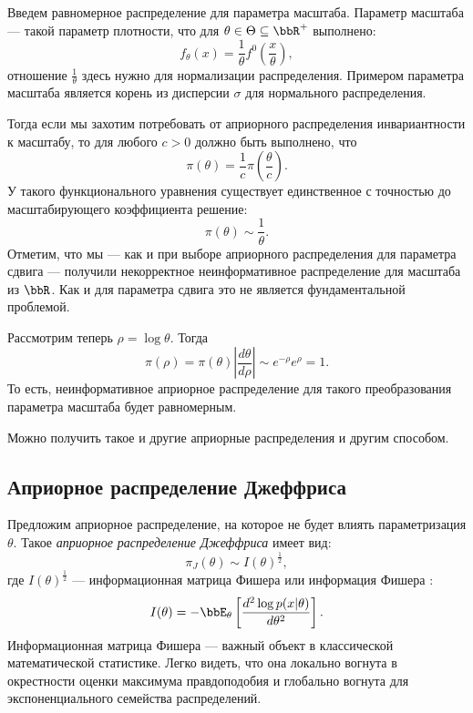 \begin{example}
Введем равномерное распределение для параметра масштаба.
Параметр масштаба --- такой параметр плотности, что для $\theta \in \Theta \subseteq \bbR^+$ выполнено:
\[
f_\theta(x) = \frac{1}{\theta} f^0 \left(\frac{x}{\theta} \right),
\]
отношение $\frac{1}{\theta}$ здесь нужно для нормализации распределения.
Примером параметра масштаба является корень из дисперсии $\sigma$ для нормального распределения.


Тогда если мы захотим потребовать от априорного распределения инвариантности к масштабу, 
то для любого $c > 0$ должно быть выполнено, что
\[
\pi(\theta) = \frac{1}{c} \pi \left(\frac{\theta}{c} \right).
\]
У такого функционального уравнения существует единственное с точностью до масштабирующего коэффициента решение:
\[
\pi(\theta) \sim \frac{1}{\theta}.
\]
Отметим, что мы --- как и при выборе априорного распределения для параметра сдвига --- получили некорректное неинформативное распределение для масштаба из $\bbR$.
Как и для параметра сдвига это не является фундаментальной проблемой.

Рассмотрим теперь $\rho = \log \theta$.
Тогда 
\[
\pi(\rho) = \pi(\theta) \left| \frac{d \theta}{d \rho} \right| \sim e^{-\rho} e^{\rho} = 1.
\]
То есть, неинформативное априорное распределение для такого преобразования параметра масштаба будет равномерным.

Можно получить такое и другие априорные распределения и другим способом.
\end{example}



\subsection{Априорное распределение Джеффриса}

Предложим априорное распределение, на которое не будет влиять параметризация $\theta$.
Такое \emph{априорное распределение Джеффриса} имеет вид:
\[
\pi_J(\theta) \sim I(\theta)^{\frac12},
\]
где $I(\theta)^{\frac12}$ --- информационная матрица Фишера или информация Фишера :
\[
I(\theta) = - \bbE_{\theta} \left[\frac{d^2 \log p(x| \theta)}{d \theta^2} \right].
\]
Информационная матрица Фишера --- важный объект в классической математической статистике.
Легко видеть, что она локально вогнута в окрестности оценки максимума правдоподобия 
и глобально вогнута для экспоненциального семейства распределений.

